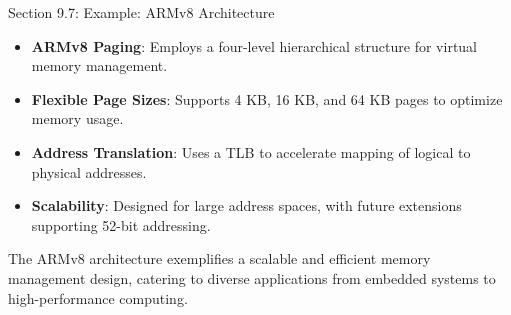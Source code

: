 \begin{notes}{Section 9.7: Example: ARMv8 Architecture}
\begin{highlight}
    \end{highlight}
    
    \begin{highlight}
    
        \begin{itemize}
            \item \textbf{ARMv8 Paging}: Employs a four-level hierarchical structure for virtual memory management.
            \item \textbf{Flexible Page Sizes}: Supports 4 KB, 16 KB, and 64 KB pages to optimize memory usage.
            \item \textbf{Address Translation}: Uses a TLB to accelerate mapping of logical to physical addresses.
            \item \textbf{Scalability}: Designed for large address spaces, with future extensions supporting 52-bit addressing.
        \end{itemize}
    
    The ARMv8 architecture exemplifies a scalable and efficient memory management design, catering to diverse applications from embedded systems to high-performance computing.
    
    \end{highlight}
\end{notes}